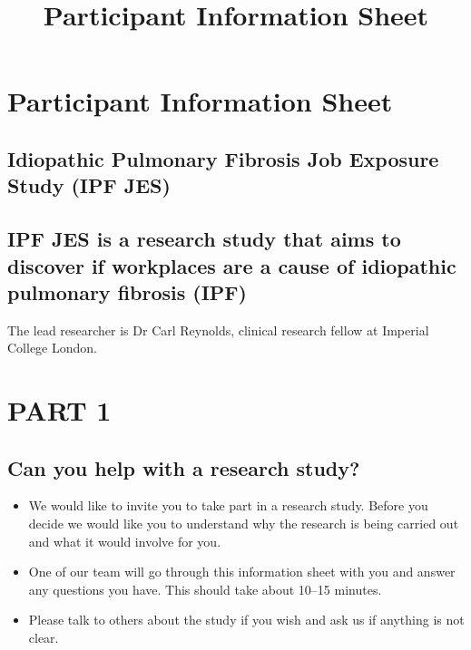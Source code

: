 \documentclass[a4paper,10pt]{article}
\title{\bf Participant Information Sheet}
\date{}
\begin{document}
\pagestyle{fancy} 






\section*{}
\vspace{0.6cm}
\section*{Participant Information Sheet}

\subsection*{Idiopathic Pulmonary Fibrosis Job Exposure Study (IPF JES)}
\subsection*{IPF JES is a research study that aims to discover if workplaces are a cause of idiopathic pulmonary fibrosis (IPF)}

The lead researcher is Dr Carl Reynolds, clinical research fellow at Imperial College London.

\section*{PART 1}
\subsection*{Can you help with a research study?}

\begin{itemize}
 \item We would like to invite you to take part in a research study. Before you decide we would like you to understand why the research is being carried out and what it would involve for you.  
 \item One of our team will go through this information sheet with you and answer any questions you have. This should take about 10--15 minutes.
 \item Please talk to others about the study if you wish and ask us if anything is not clear.
\end{itemize}
\end{document}
